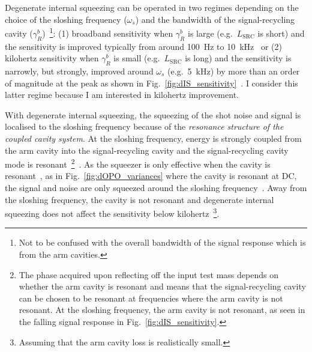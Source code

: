 Degenerate internal squeezing can be operated in two regimes depending on the choice of the sloshing frequency ($\omega_s$) and the bandwidth of the signal-recycling cavity ($\gamma^b_R$)~\footnote{Not to be confused with the overall bandwidth of the signal response which is from the arm cavities.}: (1) broadband sensitivity when $\gamma^b_R$ is large (e.g.\ $L_\text{SRC}$ is short) and the sensitivity is improved typically from around 100~Hz to 10~kHz~\cite{korobkoQuantumExpanderGravitationalwave2019} or (2) kilohertz sensitivity when $\gamma^b_R$ is small (e.g.\ $L_\text{SRC}$ is long) and the sensitivity is narrowly, but strongly, improved around $\omega_s$ (e.g.\ 5~kHz) by more than an order of magnitude at the peak as shown in Fig.~\ref{fig:dIS_sensitivity}~\cite{adyaQuantumEnhancedKHz2020}. I consider this latter regime because I am interested in kilohertz improvement.

With degenerate internal squeezing, the squeezing of the shot noise and signal is localised to the sloshing frequency because of the \emph{resonance structure of the coupled cavity system}. At the sloshing frequency, energy is strongly coupled from the arm cavity into the signal-recycling cavity and the signal-recycling cavity mode is resonant~\footnote{The phase acquired upon reflecting off the input test mass depends on whether the arm cavity is resonant and means that the signal-recycling cavity can be chosen to be resonant at frequencies where the arm cavity is not resonant. At the sloshing frequency, the arm cavity is not resonant, as seen in the falling signal response in Fig.~\ref{fig:dIS_sensitivity}.}~\cite{korobkoTamingQuantumNoiseHow2020}. As the squeezer is only effective when the cavity is resonant~\cite{}, as in Fig.~\ref{fig:dOPO_variances} where the cavity is resonant at DC, the signal and noise are only squeezed around the sloshing frequency~\cite{}. Away from the sloshing frequency, the cavity is not resonant and degenerate internal squeezing does not affect the sensitivity below kilohertz~\footnote{Assuming that the arm cavity loss is realistically small.}.

